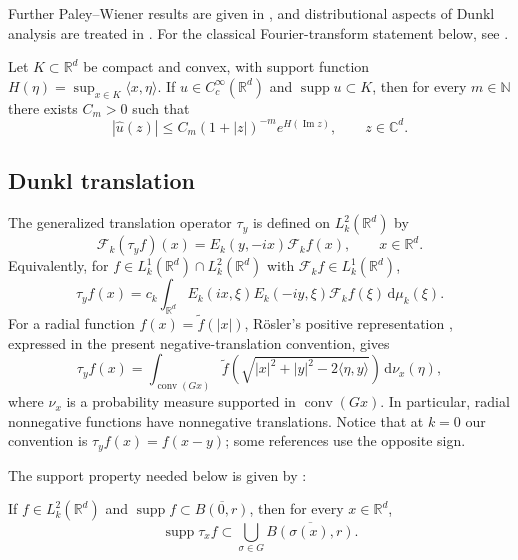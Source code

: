 \documentclass[12pt]{article}
\DeclareMathOperator{\supp}{supp}
\begin{document}
Further Paley--Wiener results are given in \cite{MFE2}, and distributional aspects of Dunkl analysis are treated in \cite{KT1}. For the classical Fourier-transform statement below, see \cite{LH1}.
\begin{lemma}\label{LPYC}
Let $K\subset\mathbb{R}^d$ be compact and convex, with support function $H(\eta)=\sup_{x\in K}\langle x,\eta\rangle$. If $u\in C_c^\infty(\mathbb{R}^d)$ and $\supp u\subset K$, then for every $m\in\mathbb{N}$ there exists $C_m>0$ such that
\[
|\widehat{u}(z)|\leq C_m(1+|z|)^{-m}e^{H(\operatorname{Im} z)}, \qquad z\in \mathbb{C}^d.
\]
\end{lemma}

 

\subsection{Dunkl translation}\label{subsec:translation}

The generalized translation operator $\tau_y$ is defined on $L_k^2(\mathbb{R}^d)$ by
\[
\mathcal{F}_k(\tau_y f)(x) = E_k(y, -i x) \mathcal{F}_k f(x), \qquad x \in \mathbb{R}^d.
\]
Equivalently, for $f \in L_k^1(\mathbb{R}^d) \cap L_k^2(\mathbb{R}^d)$ with $\mathcal{F}_k f \in L_k^1(\mathbb{R}^d)$,
\[
\tau_y f(x) = c_k \int_{\mathbb{R}^d} E_k(i x, \xi) E_k(-i y, \xi) \mathcal{F}_k f(\xi) \, \mathrm{d}\mu_k(\xi).
\]
For a radial function $f(x)=\widetilde f(|x|)$, R\"osler's positive representation \cite{MR3}, expressed in the present negative-translation convention, gives
\[
\tau_y f(x)=\int_{\operatorname{conv}(Gx)}
\widetilde f\!\left(\sqrt{|x|^2+|y|^2-2\langle\eta,y\rangle}\right)\,\mathrm{d}\nu_x(\eta),
\]
where $\nu_x$ is a probability measure supported in $\operatorname{conv}(Gx)$. In particular, radial nonnegative functions have nonnegative translations. Notice that at $k=0$ our convention is $\tau_y f(x)=f(x-y)$; some references use the opposite sign.

The support property needed below is given by \cite[Theorem~1.7]{JDA2}:

If $f \in L_k^2(\mathbb{R}^d)$ and $\supp f \subset \overline{B(0,r)}$, then for every $x \in \mathbb{R}^d$,
\[
\supp \tau_x f \subset \bigcup_{\sigma \in G} \overline{B(\sigma(x), r)}.
\]
\end{document}
